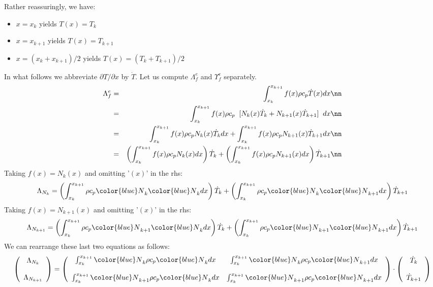 Rather reassuringly, we have:
\begin{itemize}
\item $x=x_k$ yields $T(x)=T_k$
\item $x=x_{k+1}$ yields $T(x)=T_{k+1}$
\item $x=(x_k+x_{k+1})/2$ yields $T(x)=(T_k+T_{k+1})/2$
\end{itemize}
In what follows we abbreviate $\partial T/\partial x$ by $\dot{T}$.
Let us compute ${\Lambda}_f^e$ and ${\Upsilon}_f^e$ separately.
\begin{eqnarray}
{\Lambda}_f^e 
&=&\int_{x_k}^{x_{k+1}} f(x) \rho c_p \dot T(x) dx \nn\\
&=& \int_{x_k}^{x_{k+1}} f(x) \rho c_p \;\;  [ N_{k}(x) \dot{T}_k + N_{k+1}(x) \dot{T}_{k+1} ] \;\; dx  \nn\\
&=& \int_{x_k}^{x_{k+1}} f(x) \rho c_p N_{k}(x) \dot{T}_k  dx  + \int_{x_k}^{x_{k+1}} f(x) \rho c_p N_{k+1}(x) \dot{T}_{k+1}   dx \nn\\
&=&  \left( \int_{x_k}^{x_{k+1}} f(x) \rho c_p  N_{k}(x) dx \right) \dot{T}_k  
+ \left( \int_{x_k}^{x_{k+1}} f(x) \rho c_p N_{k+1}(x) dx \right)  \dot{T}_{k+1}  \nn
\end{eqnarray}
Taking $f(x)=N_k(x)$ and omitting '$(x)$' in the rhs:
\[
{\Lambda}_{N_k}=
\left( \int_{x_k}^{x_{k+1}} \rho c_p  {\color{blue}N}_k {\color{blue}N}_{k} dx \right) \dot{T}_k  
+ \left( \int_{x_k}^{x_{k+1}} \rho c_p {\color{blue}N}_k {\color{blue}N}_{k+1} dx \right)  \dot{T}_{k+1} 
\]
Taking $f(x)=N_{k+1}(x)$ and omitting '$(x)$' in the rhs:
\[
{\Lambda}_{N_{k+1}}
=  \left( \int_{x_k}^{x_{k+1}} \rho c_p {\color{blue}N}_{k+1} {\color{blue}N}_{k} dx \right) \dot{T}_k  
+ \left( \int_{x_k}^{x_{k+1}}  \rho c_p  {\color{blue}N}_{k+1} {\color{blue}N}_{k+1} dx \right)  \dot{T}_{k+1} 
\]
We can rearrange these last two equations as follows:
\[
\left(
\begin{array}{c}
{\Lambda}_{N_k}  \\ \\ {\Lambda}_{N_{k+1}}
\end{array}
\right)
=
\left(
\begin{array}{cc}
\int_{x_k}^{x_{k+1}} {\color{blue}N}_k     \rho c_p {\color{blue}N}_{k} dx  &  \int_{x_k}^{x_{k+1}} {\color{blue}N}_k     \rho c_p {\color{blue}N}_{k+1} dx \\ \\
\int_{x_k}^{x_{k+1}} {\color{blue}N}_{k+1} \rho c_p {\color{blue}N}_{k} dx  &  \int_{x_k}^{x_{k+1}} {\color{blue}N}_{k+1} \rho c_p {\color{blue}N}_{k+1} dx 
\end{array}
\right)
\cdot
\left(
\begin{array}{c}
\dot{T}_k \\ \\
\dot{T}_{k+1}
\end{array}
\right)
\]

